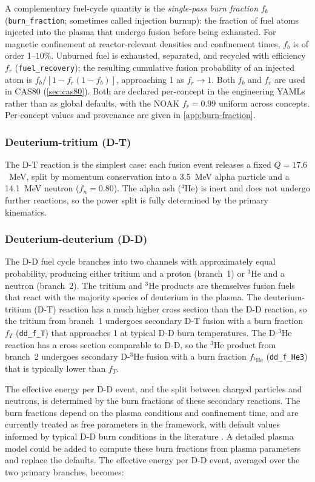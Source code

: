 \documentclass{article}
\begin{document}
A complementary fuel-cycle quantity is the \emph{single-pass burn
fraction} $f_b$ (\texttt{burn\_fraction}; sometimes called injection
burnup): the fraction of fuel atoms injected into the plasma that
undergo fusion before being exhausted. For magnetic confinement at
reactor-relevant densities and confinement times, $f_b$ is of order 1--$10\%$.
Unburned fuel is exhausted, separated, and recycled with efficiency
$f_r$ (\texttt{fuel\_recovery}); the resulting cumulative fusion
probability of an injected atom is $f_b / [1 - f_r(1-f_b)]$,
approaching 1 as $f_r \to 1$. Both $f_b$ and $f_r$ are used in CAS80
(\cref{sec:cas80}). Both are declared per-concept in the engineering
YAMLs rather than as global defaults, with the NOAK $f_r = 0.99$ uniform
across concepts. Per-concept values and provenance are given in
\cref{app:burn-fraction}.

\subsubsection{Deuterium-tritium (D-T)}
The D-T reaction is the simplest case: each fusion event releases a
fixed $Q = 17.6$~MeV, split by momentum conservation into a 3.5~MeV
alpha particle and a 14.1~MeV neutron ($f_n = 0.80$). The alpha ash
(${}^4$He) is inert and does not undergo further reactions, so the
power split is fully determined by the primary kinematics.

\subsubsection{Deuterium-deuterium (D-D)}
The D-D fuel cycle branches into two channels with approximately equal
probability, producing
either tritium and a proton (branch~1) or ${}^3$He and a neutron (branch~2).
The tritium and ${}^3$He products are themselves fusion fuels that react
with the majority species of deuterium in the plasma. The deuterium-tritium
(D-T) reaction has a much higher cross section than the D-D reaction, so the tritium
from branch~1 undergoes secondary D-T fusion with a burn fraction $f_T$
(\texttt{dd\_f\_T}) that approaches 1 at typical D-D burn
temperatures. The D-${}^3$He reaction has a cross section comparable
to D-D, so the ${}^3$He product from branch~2 undergoes secondary
D-${}^3$He fusion with a burn fraction $f_{{}^3\text{He}}$
(\texttt{dd\_f\_He3}) that is typically lower than $f_T$.

The effective energy per D-D event, and the split between charged particles and neutrons,
is determined by the burn fractions of these secondary reactions. 
The burn fractions depend on the plasma conditions and confinement time, and are
currently treated as free parameters in the framework, with default values
informed by typical D-D burn conditions in the literature \citep{huba2016}.
A detailed plasma model could be added to compute these burn fractions from plasma parameters and replace the defaults.
The effective energy per D-D event, averaged over the two primary branches, becomes:
\end{document}
